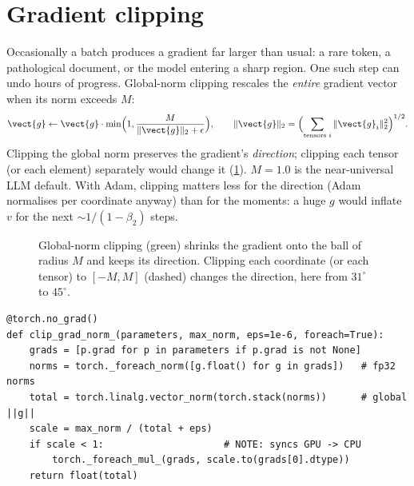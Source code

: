 \section{Gradient clipping}\label{sec:optim:clip}

Occasionally a batch produces a gradient far larger than usual: a rare token, a pathological
document, or the model entering a sharp region. One such step can undo hours of progress.
Global-norm clipping rescales the \emph{entire} gradient vector when its norm exceeds $M$:
\begin{equation}
\vect{g} \leftarrow \vect{g}\cdot\min\Bigl(1, \frac{M}{\|\vect{g}\|_2+\epsilon}\Bigr),
\qquad \|\vect{g}\|_2 = \Bigl(\sum_{\text{tensors }i}\|\vect{g}_i\|_2^2\Bigr)^{1/2}.
\label{eq:optim:clip}
\end{equation}
Clipping the global norm preserves the gradient's \emph{direction}; clipping each tensor (or
each element) separately would change it (\cref{fig:optim:clip}). $M=1.0$ is the near-universal
LLM default. With Adam, clipping matters less for the direction (Adam normalises per coordinate
anyway) than for the moments: a huge $g$ would inflate $v$ for the next $\sim 1/(1-\beta_2)$
steps.

\begin{figure}[t]
\centering
{}
\caption{Global-norm clipping (green) shrinks the gradient onto the ball of radius $M$ and keeps
its direction. Clipping each coordinate (or each tensor) to $[-M,M]$ (dashed) changes the
direction, here from $31^\circ$ to $45^\circ$.}
\label{fig:optim:clip}
\end{figure}

\begin{lstlisting}[caption={Global-norm clipping with multi-tensor kernels. It returns the \emph{pre-clip} norm, the single most useful scalar to log.},label={lst:optim:clipcode}]
@torch.no_grad()
def clip_grad_norm_(parameters, max_norm, eps=1e-6, foreach=True):
    grads = [p.grad for p in parameters if p.grad is not None]
    norms = torch._foreach_norm([g.float() for g in grads])   # fp32 norms
    total = torch.linalg.vector_norm(torch.stack(norms))      # global ||g||
    scale = max_norm / (total + eps)
    if scale < 1:                     # NOTE: syncs GPU -> CPU
        torch._foreach_mul_(grads, scale.to(grads[0].dtype))
    return float(total)
\end{lstlisting}

